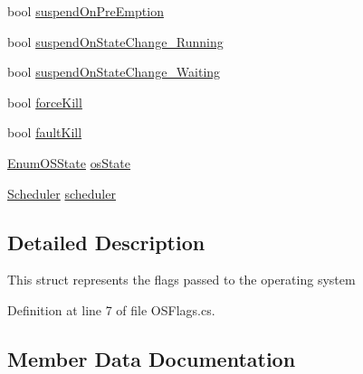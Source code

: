 \begin{DoxyCompactItemize}
\item 
bool \hyperlink{struct_c_p_u___o_s___simulator_1_1_operating___system_1_1_o_s_flags_a78836e63be936381215978ac392e1e60}{suspend\+On\+Pre\+Emption}
\item 
bool \hyperlink{struct_c_p_u___o_s___simulator_1_1_operating___system_1_1_o_s_flags_a828cad0b61448732b96162511e18352f}{suspend\+On\+State\+Change\+\_\+\+Running}
\item 
bool \hyperlink{struct_c_p_u___o_s___simulator_1_1_operating___system_1_1_o_s_flags_ac3439768b6e151e974a26a35ab0452a2}{suspend\+On\+State\+Change\+\_\+\+Waiting}
\item 
bool \hyperlink{struct_c_p_u___o_s___simulator_1_1_operating___system_1_1_o_s_flags_a36b9fca448bc8bc9d3fa51063b9efce5}{force\+Kill}
\item 
bool \hyperlink{struct_c_p_u___o_s___simulator_1_1_operating___system_1_1_o_s_flags_ab6e0543edd30b393255293bccf19c9d1}{fault\+Kill}
\item 
\hyperlink{namespace_c_p_u___o_s___simulator_1_1_operating___system_a03a98a403abc737c106a8f92db5bffc1}{Enum\+O\+S\+State} \hyperlink{struct_c_p_u___o_s___simulator_1_1_operating___system_1_1_o_s_flags_a7337260d7d298a9a195322b2bddb2102}{os\+State}
\item 
\hyperlink{class_c_p_u___o_s___simulator_1_1_operating___system_1_1_scheduler}{Scheduler} \hyperlink{struct_c_p_u___o_s___simulator_1_1_operating___system_1_1_o_s_flags_a4f93341c66d459dc18aaaad2df38b71d}{scheduler}
\end{DoxyCompactItemize}


\subsection{Detailed Description}
This struct represents the flags passed to the operating system 



Definition at line 7 of file O\+S\+Flags.\+cs.



\subsection{Member Data Documentation}
\hypertarget{struct_c_p_u___o_s___simulator_1_1_operating___system_1_1_o_s_flags_ac1d1812ad9ef56ccadacb19831d2e92d}{}
